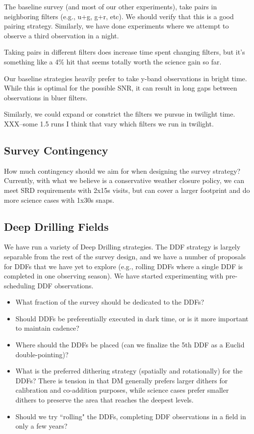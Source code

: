 The baseline survey (and most of our other experiments), take pairs in neighboring filters (e.g., u+g, g+r, etc).  We should verify that this is a good pairing strategy. Similarly, we have done experiments where we attempt to observe a third observation in a night. 

Taking pairs in different filters does increase time spent changing filters, but it's something like a 4\% hit that seems totally worth the science gain so far. 

Our baseline strategies heavily prefer to take y-band observations in bright time. While this is optimal for the possible SNR, it can result in long gaps between observations in bluer filters. 

Similarly, we could expand or constrict the filters we pursue in twilight time. XXX--some 1.5 runs I think that vary which filters we run in twilight.

\subsection{Survey Contingency}

How much contingency should we aim for when designing the survey strategy?  Currently, with what we believe is a conservative weather closure policy, we can meet SRD requirements with 2x15s visits, but can cover a larger footprint and do more science cases with 1x30s snaps.  

\subsection{Deep Drilling Fields}

We have run a variety of Deep Drilling strategies. The DDF strategy is largely separable from the rest of the survey design, and we have a number of proposals for DDFs that we have yet to explore (e.g., rolling DDFs where a single DDF is completed in one observing season).  We have started experimenting with pre-scheduling DDF observations. 

\begin{itemize}
    \item{What fraction of the survey should be dedicated to the DDFs?}
    \item{Should DDFs be preferentially executed in dark time, or is it more important to maintain cadence?}
    \item{Where should the DDFs be placed (can we finalize the 5th DDF as a Euclid double-pointing)?}
    \item{What is the preferred dithering strategy (spatially and rotationally) for the DDFs? There is tension in that DM generally prefers larger dithers for calibration and co-addition purposes, while science cases prefer smaller dithers to preserve the area that reaches the deepest levels.}
    \item{Should we try ``rolling" the DDFs, completing DDF observations in a field in only a few years?}
\end{itemize}

